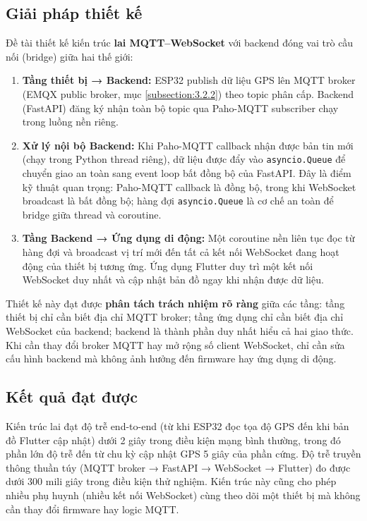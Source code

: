 \documentclass[../DoAn.tex]{subfiles}
\begin{document}
\subsection{Giải pháp thiết kế}

Đề tài thiết kế kiến trúc \textbf{lai MQTT–WebSocket} với backend đóng vai trò cầu nối (bridge) giữa hai thế giới:

\begin{enumerate}
    \item \textbf{Tầng thiết bị → Backend:} ESP32 publish dữ liệu GPS lên MQTT broker (EMQX public broker, mục \ref{subsection:3.2.2}) theo topic phân cấp. Backend (FastAPI) đăng ký nhận toàn bộ topic qua Paho-MQTT subscriber chạy trong luồng nền riêng.

    \item \textbf{Xử lý nội bộ Backend:} Khi Paho-MQTT callback nhận được bản tin mới (chạy trong Python thread riêng), dữ liệu được đẩy vào \texttt{asyncio.Queue} để chuyển giao an toàn sang event loop bất đồng bộ của FastAPI. Đây là điểm kỹ thuật quan trọng: Paho-MQTT callback là đồng bộ, trong khi WebSocket broadcast là bất đồng bộ; hàng đợi \texttt{asyncio.Queue} là cơ chế an toàn để bridge giữa thread và coroutine.

    \item \textbf{Tầng Backend → Ứng dụng di động:} Một coroutine nền liên tục đọc từ hàng đợi và broadcast vị trí mới đến tất cả kết nối WebSocket đang hoạt động của thiết bị tương ứng. Ứng dụng Flutter duy trì một kết nối WebSocket duy nhất và cập nhật bản đồ ngay khi nhận được dữ liệu.
\end{enumerate}

Thiết kế này đạt được \textbf{phân tách trách nhiệm rõ ràng} giữa các tầng: tầng thiết bị chỉ cần biết địa chỉ MQTT broker; tầng ứng dụng chỉ cần biết địa chỉ WebSocket của backend; backend là thành phần duy nhất hiểu cả hai giao thức. Khi cần thay đổi broker MQTT hay mở rộng số client WebSocket, chỉ cần sửa cấu hình backend mà không ảnh hưởng đến firmware hay ứng dụng di động.

\subsection{Kết quả đạt được}

Kiến trúc lai đạt độ trễ end-to-end (từ khi ESP32 đọc tọa độ GPS đến khi bản đồ Flutter cập nhật) dưới 2 giây trong điều kiện mạng bình thường, trong đó phần lớn độ trễ đến từ chu kỳ cập nhật GPS 5 giây của phần cứng. Độ trễ truyền thông thuần túy (MQTT broker → FastAPI → WebSocket → Flutter) đo được dưới 300 mili giây trong điều kiện thử nghiệm. Kiến trúc này cũng cho phép nhiều phụ huynh (nhiều kết nối WebSocket) cùng theo dõi một thiết bị mà không cần thay đổi firmware hay logic MQTT.
\end{document}
